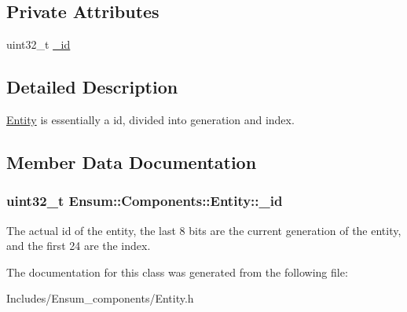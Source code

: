 \subsection*{Private Attributes}
\begin{DoxyCompactItemize}
\item 
uint32\+\_\+t \hyperlink{class_ensum_1_1_components_1_1_entity_a061100915c04852c58baff9e82d6d8b0}{\+\_\+id}
\end{DoxyCompactItemize}


\subsection{Detailed Description}
\hyperlink{class_ensum_1_1_components_1_1_entity}{Entity} is essentially a id, divided into generation and index. 

\subsection{Member Data Documentation}
\subsubsection[{\texorpdfstring{\+\_\+id}{_id}}]{\setlength{\rightskip}{0pt plus 5cm}uint32\+\_\+t Ensum\+::\+Components\+::\+Entity\+::\+\_\+id\hspace{0.3cm}{\ttfamily [private]}}\hypertarget{class_ensum_1_1_components_1_1_entity_a061100915c04852c58baff9e82d6d8b0}{}\label{class_ensum_1_1_components_1_1_entity_a061100915c04852c58baff9e82d6d8b0}
The actual id of the entity, the last 8 bits are the current generation of the entity, and the first 24 are the index. 

The documentation for this class was generated from the following file\+:\begin{DoxyCompactItemize}
\item 
Includes/\+Ensum\+\_\+components/Entity.\+h\end{DoxyCompactItemize}
